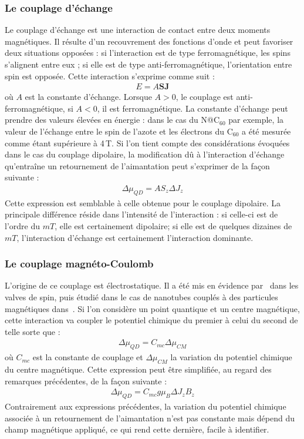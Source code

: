 \subsubsection{Le couplage d'échange}
Le couplage d'échange est une interaction de contact entre deux moments magnétiques. Il résulte d'un recouvrement des fonctions d'onde et peut favoriser deux situations opposées : si l'interaction est de type ferromagnétique, les spins s'alignent entre eux ; si elle est de type anti-ferromagnétique, l'orientation entre spin est opposée. Cette interaction s'exprime comme suit :
\begin{eqnarray}
E = A\mathbf{SJ} \nonumber
\end{eqnarray}
où $A$ est la constante d'échange. Lorsque $A>0$, le couplage est anti-ferromagnétique, si $A<0$, il est ferromagnétique. La constante d'échange peut prendre des valeurs élevées en énergie : dans le cas du N@C$_{60}$ par exemple, la valeur de l'échange entre le spin de l'azote et les électrons du C$_{60}$ a été mesurée comme étant supérieure à 4\,T. Si l'on tient compte des considérations évoquées dans le cas du couplage dipolaire, la modification d\^u à l'interaction d'échange qu’entraîne un retournement de l'aimantation peut s'exprimer de la façon suivante :
\begin{eqnarray}
\Delta \mu_{QD} = AS_z\Delta J_z\nonumber
\end{eqnarray}
Cette expression est semblable à celle obtenue pour le couplage dipolaire. La principale différence réside dans l'intensité de l'interaction : si celle-ci est de l'ordre du $mT$, elle est certainement dipolaire; si elle est de quelques dizaines de $mT$, l'interaction d'échange est certainement l'interaction dominante.

\subsubsection{Le couplage magnéto-Coulomb}
L'origine de ce couplage est électrostatique. Il a été mis en évidence par~\cite{Molen2006} dans les valves de spin, puis étudié dans le cas de nanotubes couplés à des particules magnétiques dans~\cite{Datta2011}. Si l'on considère un point quantique et un centre magnétique, cette interaction va coupler le potentiel chimique du premier à celui du second de telle sorte que :
\begin{eqnarray}
\Delta \mu_{QD} = C_{mc} \Delta \mu_{CM}
\end{eqnarray}
où $C_{mc}$ est la constante de couplage et $\Delta \mu_{CM}$ la variation du potentiel chimique du centre magnétique. Cette expression peut être simplifiée, au regard des remarques précédentes, de la façon suivante :
\begin{eqnarray}
\Delta \mu_{QD} = C_{mc} g \mu_B  \Delta J_z B_z
\end{eqnarray}
Contrairement aux expressions précédentes, la variation du potentiel chimique associée à un retournement de l'aimantation n'est pas constante mais dépend du champ magnétique appliqué, ce qui rend cette dernière, facile à identifier.


